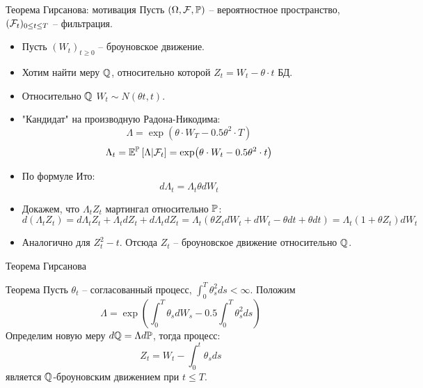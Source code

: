 \documentclass[aspectratio=169]{beamer}
\begin{document}
\begin{frame}{Теорема Гирсанова: мотивация}
    Пусть $(\Omega, \mathcal{F}, \mathbb{P})$ -- вероятностное пространство, $(\mathcal{F}_t)_{0 \leq t \leq T}$ -- фильтрация.
    \begin{itemize}
        \item Пусть $(W_t)_{t\geq 0}$ -- броуновское движение. 
        \item Хотим найти меру $\mathbb{Q}$, относительно которой $Z_t = W_t - \theta \cdot t$ БД.
        \item Относительно $\mathbb{Q}$ $W_t \sim N(\theta t, t)$.
        \item "Кандидат" на производную Радона-Никодима:
        $$
            \Lambda = \exp(\theta \cdot W_T - 0.5 \theta^2 \cdot T)
        $$
        $$
            \Lambda_t = \mathbb{E}^{\mathbb{P}} \left[ \Lambda | \mathcal{F}_t \right] = \exp(\theta \cdot W_t - 0.5 \theta^2 \cdot t)
        $$
\pause
        \item По формуле Ито:
        $$
            d\Lambda_t = \Lambda_t \theta dW_t
        $$
        \item Докажем, что $\Lambda_t Z_t$ мартингал относительно $\mathbb{P}$:
        $$
            d(\Lambda_t Z_t) = 
            d\Lambda_t Z_t + \Lambda_t dZ_t + d\Lambda_t dZ_t
            = \Lambda_t \left( \theta Z_t dW_t + dW_t - \theta dt + \theta dt \right) =  
            \Lambda_t (1 + \theta Z_t ) dW_t
        $$
        \item Аналогично для $Z_t^2 - t$. Отсюда $Z_t$ -- броуновское движение относительно $\mathbb{Q}$.
    \end{itemize}
\end{frame}

\begin{frame}{Теорема Гирсанова}
    \begin{block}{Теорема}
        Пусть $\theta_t$ -- согласованный процесс, $\int_0^T \theta_s^2 ds < \infty$. Положим
        $$
            \Lambda = \exp(\int_0^T \theta_s dW_s - 0.5 \int_0^T \theta_s^2 ds)
        $$Определим новую меру $d\mathbb{Q} = \Lambda d\mathbb{P}$, тогда процесс:
        $$
            Z_t = W_t - \int_0^t \theta_s ds
        $$является $\mathbb{Q}$-броуновским движением при $t \leq T$.
    \end{block}
\end{frame}
\end{document}
